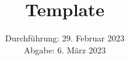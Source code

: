 

\subject{\texorpdfstring{\vspace{2ex}}{}123\texorpdfstring{\vspace{-2ex}}{}} %
\title{Template} %
\date{
	Durchführung: 29. Februar 2023%
	\\ Abgabe: 6. März 2023%
}




\maketitle
\thispagestyle{empty}


\tableofcontents
\newpage







\printbibliography{}

\newpage



